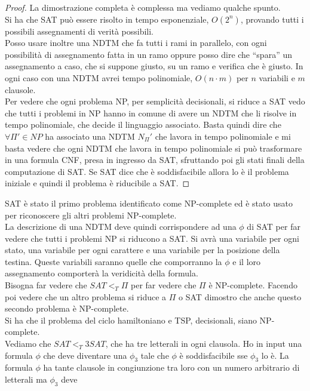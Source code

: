 \begin{proof}
  La dimostrazione completa è complessa ma vediamo qualche spunto.\\
  Si ha che SAT può essere risolto in tempo esponenziale, $O(2^n)$, provando
  tutti i possibili assegnamenti di verità possibili.\\
  Posso usare inoltre una NDTM che fa tutti i rami in parallelo, con ogni
  possibilità di assegnamento fatta in un ramo oppure posso dire che ``spara''
  un assegnamento a caso, che si suppone giusto, su un ramo e verifica che è
  giusto. In ogni caso con una NDTM avrei tempo polinomiale, $O(n\cdot m)$ per
  $n$ variabili e $m$ clausole.\\
  Per vedere che ogni problema NP, per semplicità decisionali, si riduce a SAT
  vedo che tutti i problemi in NP hanno in comune di avere un NDTM che li
  risolve in tempo polinomiale, che decide il linguaggio associato. Basta quindi
  dire che $\forall\Pi'\in NP$ ha associato una NDTM $N_\Pi'$ che lavora in
  tempo polinomiale e mi basta vedere che ogni NDTM che lavora in tempo
  polinomiale si può trasformare in una formula CNF, presa in ingresso da SAT,
  sfruttando poi gli stati finali della computazione di SAT. Se SAT dice che è
  soddisfacibile allora lo è il problema iniziale e quindi il problema è
  riducibile a SAT.
\end{proof}
SAT è stato il primo problema identificato come NP-complete ed è stato usato per
riconoscere gli altri problemi NP-complete.\\
La descrizione di una NDTM deve quindi corrispondere ad una $\phi$ di SAT per
far vedere che tutti i problemi NP si riducono a SAT. Si avrà una variabile per
ogni stato, una variabile per ogni carattere e una variabile per la posizione
della testina. Queste variabili saranno quelle che comporranno la $\phi$ e il
loro assegnamento comporterà la veridicità della formula.\\
Bisogna far vedere che $SAT<_T \Pi$ per far vedere che $\Pi$ è
NP-complete. Facendo poi vedere che un altro problema si riduce a $\Pi$ o SAT
dimostro che anche questo secondo problema è NP-complete. \\
Si ha che il problema del ciclo hamiltoniano e TSP, decisionali, siano
NP-complete.\\
Vediamo che $SAT<_T 3SAT$, che ha tre letterali in ogni clausola. Ho in input
una formula $\phi$ che deve diventare una $\phi_3$ tale che $\phi$ è
soddisfacibile sse $\phi_3$ lo è. La formula $\phi$ ha tante clausole in
congiunzione tra loro con un numero arbitrario di letterali ma $\phi_3$ deve
